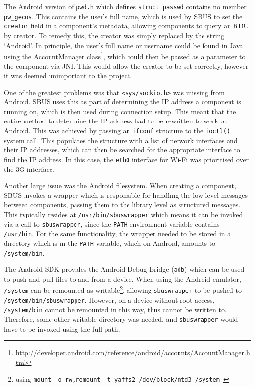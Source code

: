 \documentclass[12pt,twoside,notitlepage]{report}
\begin{document}
The Android version of {\tt pwd.h} which defines {\tt struct passwd} contains no member {\tt pw\_gecos}. 
This contains the user's full name, which is used by SBUS to set the {\tt creator} field in a component's metadata, allowing components to query an RDC by creator. 
To remedy this, the creator was simply replaced by the string `Android'. 
In principle, the user's full name or username could be found in Java using the AccountManager class\footnote{\url{http://developer.android.com/reference/android/accounts/AccountManager.html}}, which could then be passed as a parameter to the component via JNI. 
This would allow the creator to be set correctly, however it was deemed unimportant to the project. 

One of the greatest problems was that {\tt <sys/sockio.h>} was missing from Android.
SBUS uses this as part of determining the IP address a component is running on, which is then used during connection setup. 
This meant that the entire method to determine the IP address had to be rewritten to work on Android. 
This was achieved by passing an {\tt ifconf} structure to the {\tt ioctl()} system call.
This populates the structure with a list of network interfaces and their IP addresses, which can then be searched for the appropriate interface to find the IP address. 
In this case, the {\tt eth0} interface for Wi-Fi was prioritised over the 3G interface.

Another large issue was the Android filesystem. 
When creating a component, SBUS invokes a wrapper which is responsible for handling the low level messages between components, passing them to the library level as structured messages.
This typically resides at {\tt /usr/bin/sbuswrapper} which means it can be invoked via a call to {\tt sbuswrapper}, since the {\tt PATH} environment variable contains {\tt /usr/bin}. 
For the same functionality, the wrapper needed to be stored in a directory which is in the {\tt PATH} variable, which on Android, amounts to {\tt /system/bin}. 

The Android SDK provides the Android Debug Bridge ({\tt adb}) which can be used to push and pull files to and from a device. 
When using the Android emulator, {\tt /system} can be remounted as writable\footnote{using {\tt mount -o rw,remount -t yaffs2 /dev/block/mtd3 /system }}, allowing {\tt sbuswrapper} to be pushed to {\tt /system/bin/sbuswrapper}. 
However, on a device without root access, {\tt /system/bin} cannot be remounted in this way, thus cannot be written to. 
Therefore, some other writable directory was needed, and {\tt sbuswrapper} would have to be invoked using the full path. 
\end{document}
